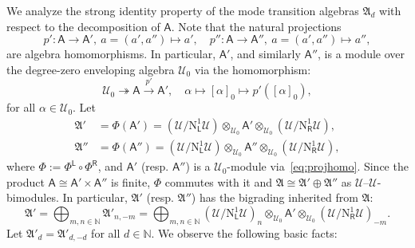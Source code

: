 \documentclass[12pt,a4paper,reqno]{amsart}
\numberwithin{equation}{section}
\theoremstyle{definition}
\newcommand{\N}{\mathbb{N}}
\def\L{\mathsf{L}}
\def\R{\mathsf{R}}
\def \al{\alpha}
\def\o{\otimes}
\def\ra{\rightarrow}
\def\op{\oplus}
\def\scrU{\mathscr{U}}
\def\fA{\mathfrak{A}}
\def\rN{\mathrm{N}}
\def\A{\mathsf{A}}
\begin{document}
We analyze the strong identity property of the mode transition algebras $\fA_d$ with respect to the decomposition of $\A$. Note that the natural projections
\[
p':\A\ra\A',\ a=(a',a'')\mapsto a',\quad  p'':\A\ra \A'',\ a=(a',a'')\mapsto a'',
\]
are algebra homomorphisms. In particular, $\A'$, and similarly $\A''$, is a module over the degree-zero enveloping algebra $\scrU_0$ via the homomorphism:
\begin{equation}\label{eq:projhomo}
\scrU_0\twoheadrightarrow \A\xrightarrow{p'}\A',\quad \al\mapsto [\al]_0\mapsto p'([\al]_0),
\end{equation}
for all $\al\in \scrU_0$.  Let
\begin{align*}
\fA'&=\Phi(\A')=(\scrU/\rN^1_\L\scrU)\o _{\scrU_0} \A'\o_{\scrU_0} (\scrU/\rN^1_\R\scrU),\\
\fA''&=\Phi(\A'')=(\scrU/\rN^1_\L\scrU)\o _{\scrU_0} \A''\o_{\scrU_0} (\scrU/\rN^1_\R\scrU),
\end{align*}
where $\Phi:=\Phi^\L\circ\Phi^\R$, and $\A'$ (resp. $\A''$) is a $\scrU_0$-module via~\eqref{eq:projhomo}. Since the product $\A\cong \A'\times\A''$ is finite, $\Phi$ commutes with it and $\fA\cong \fA'\op\fA''$ as $\scrU$--$\scrU$-bimodules. In particular, $\fA'$ (resp. $\fA''$) has the bigrading inherited from $\fA$:
\[
\fA'=\bigoplus_{m,n\in \N} \fA'_{n,-m}=\bigoplus_{m,n\in \N} (\scrU/\rN^1_\L\scrU)_n\o _{\scrU_0} \A'\o_{\scrU_0} (\scrU/\rN^1_\R\scrU)_{-m}.
\]
Let $\fA'_d=\fA'_{d,-d}$ for all $d\in \N$. We observe the following basic facts:
\end{document}
